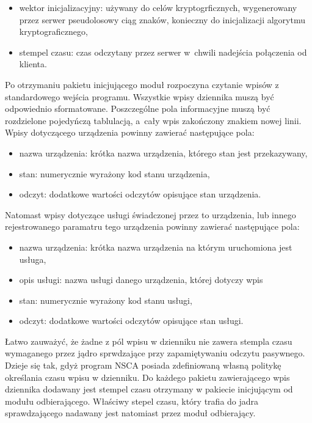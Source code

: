 \begin{itemize}
\item wektor inicjalizacyjny: używany do celów kryptogrficznych,
  wygenerowany przez serwer pseudolosowy ciąg znaków, konieczny do
  inicjalizacji algorytmu kryptograficznego,
\item stempel czasu: czas odczytany przez serwer w~chwili nadejścia
  połączenia od klienta.
\end{itemize} 

Po otrzymaniu pakietu inicjującego moduł rozpoczyna czytanie wpisów z
standardowego wejścia programu. Wszystkie wpisy dziennika muszą być odpowiednio
sformatowane. Poszczególne pola informacyjne muszą być rozdzielone
pojedyńczą tablulacją, a~cały wpis zakończony znakiem nowej
linii. Wpisy dotyczącego urządzenia powinny zawierać następujące pola:

\begin{itemize}
\item nazwa urządzenia: krótka nazwa urządzenia, którego stan jest
  przekazywany,
\item stan: numerycznie wyrażony kod stanu urządzenia,
\item odczyt: dodatkowe wartości odczytów opisujące stan urządzenia.
\end{itemize}

Natomast wpisy dotyczące usługi świadczonej przez to urządzenia, lub
innego rejestrowanego paramatru tego urządzenia powinny zawierać
następujące pola:

\begin{itemize}
\item nazwa urządzenia: krótka nazwa urządzenia na którym uruchomiona
  jest usługa,
\item opis usługi: nazwa usługi danego urządzenia, której dotyczy wpis
\item stan: numerycznie wyrażony kod stanu usługi,
\item odczyt: dodatkowe wartości odczytów opisujące stan usługi.
\end{itemize}

Łatwo zauważyć, że żadne z pól wpisu w dzienniku nie zawera stempla
czasu wymaganego przez jądro sprwdzające przy zapamiętywaniu odczytu
pasywnego. Dzieje się tak, gdyż program NSCA posiada zdefiniowaną
własną politykę określania czasu wpisu w dzienniku. Do każdego pakietu
zawierającego wpis dziennika dodawany jest stempel czasu otrzymany w
pakiecie inicjującym od modułu odbierającego. Właściwy stepel czasu,
który trafia do jadra sprawdzającego nadawany jest natomiast przez
moduł odbierający.

